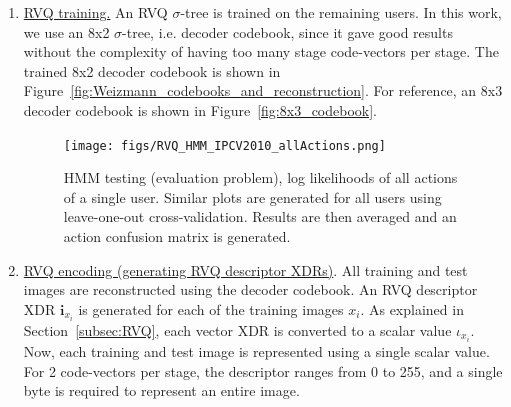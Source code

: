 \begin{Body}
\begin{enumerate}
\item \underline{RVQ training.}  An RVQ $\sigma$-tree is trained on the remaining users.  In this work, we use an 8x2 $\sigma$-tree, i.e. decoder codebook, since it gave good results without the complexity of having too many stage code-vectors per stage.  The trained 8x2 decoder codebook is shown in Figure~\ref{fig:Weizmann_codebooks_and_reconstruction}.  For reference, an 8x3 decoder codebook is shown in Figure~\ref{fig:8x3_codebook}.  

								\begin{figure}[t]	
								\texttt{[image: figs/RVQ\_HMM\_IPCV2010\_allActions.png]}
								\caption{HMM testing (evaluation problem), log likelihoods of all actions of a single user.  Similar plots are generated for all users using leave-one-out cross-validation.  Results are then averaged and an action confusion matrix is generated.}
								\label{fig:RVQ_HMM_IPCV2010_allActions}
								\end{figure}

 
\item \underline{RVQ encoding (generating RVQ descriptor XDRs)}.  All training and test images are reconstructed using the decoder codebook.  An RVQ descriptor XDR $\mathbf{i}_{x_i}$ is generated for each of the training images $x_i$.  As explained in Section~\ref{subsec:RVQ}, each vector XDR is converted to a scalar value $\iota_{x_i}$.  Now, each training and test image is represented using a single scalar value.  For 2 code-vectors per stage, the descriptor ranges from 0 to 255, and a single byte is required to represent an entire image.  



\end{enumerate}
\end{Body}
